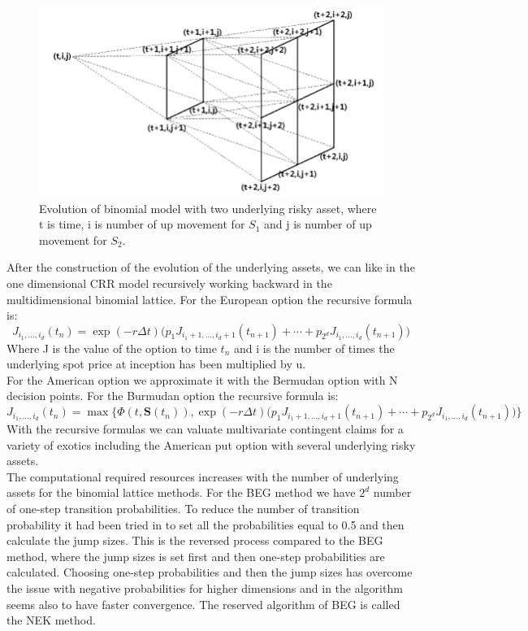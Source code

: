 \begin{figure}[th]
\centering
\includegraphics[width=\textwidth]{Figures/Three-dimensional-binomial-lattice.png}
\decoRule
\caption[Three Dimensional Binomial Lattice]{Evolution of binomial model with two underlying risky asset, where t is time, i is number of up movement for $S_1$ and j is number of up movement for $S_2$.}
\label{fig:threeDimLattice}
\end{figure}

After the construction of the evolution of the underlying assets, we can like in the one dimensional CRR model recursively working backward in the multidimensional binomial lattice. For the European option the recursive formula is:
$$J_{i_1,\ldots, i_d}(t_n)=\exp(-r\Delta t) \bigg(p_1 J_{i_1+1,\ldots, i_d +1}(t_{n+1}) + \cdots + p_{2^d} J_{i_1,\ldots, i_d}(t_{n+1}) \bigg)$$
Where J is the value of the option to time $t_n$ and i is the number of times the underlying spot price at inception has been multiplied by u.\\
For the American option we approximate it with the Bermudan option with N decision points. For the Burmudan option the recursive formula is:
$$J_{i_1,\ldots, i_d}(t_n)=\max\{\Phi(t,\bm{S}(t_n)), \exp(-r\Delta t) \bigg(p_1 J_{i_1+1,\ldots, i_d +1}(t_{n+1}) + \cdots + p_{2^d} J_{i_1,\ldots, i_d}(t_{n+1}) \bigg)\}$$
With the recursive formulas we can valuate multivariate contingent claims for a variety of exotics including the American put option with several underlying risky assets. \\

The computational required resources increases with the number of underlying assets for the binomial lattice methods. For the BEG method we have $2^d$ number of one-step transition probabilities. To reduce the number of transition probability it had been tried in \parencite{NEK} to set all the probabilities equal to 0.5 and then calculate the jump sizes. This is the reversed process compared to the BEG method, where the jump sizes is set first and then one-step probabilities are calculated. Choosing one-step probabilities and then the jump sizes has overcome the issue with negative probabilities for higher dimensions and in \parencite{NEK} the algorithm seems also to have faster convergence. The reserved algorithm of BEG is called the NEK method.\\

